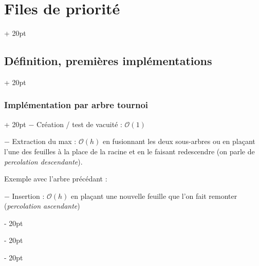 \documentclass[a4paper, 12pt, twoside]{article}
\newcommand{\ind}[1][20pt]{\advance\leftskip + #1}
\newcommand{\deind}[1][20pt]{\advance\leftskip - #1}
\newenvironment{indt}[2][20pt]{#2 \par \ind[#1]}{\par \deind} %
\begin{document}
\begin{indt}{\section{Files de priorité}}
\begin{indt}{\subsection{Définition, premières implémentations}}
\begin{indt}{\subsubsection{Implémentation par arbre tournoi}}
                $-$ Création / test de vacuité : $\mathcal O(1)$
                
                $-$ Extraction du max : $\mathcal O(h)$ en fusionnant les deux sous-arbres ou en plaçant l'une des feuilles à la place de la racine et en le faisant redescendre (on parle de \textit{percolation descendante}).
                
                Exemple avec l'arbre précédant :
                \begin{center}
                \end{center}
                
                $-$ Insertion : $\mathcal O(h)$ en plaçant une nouvelle feuille que l'on fait remonter (\textit{percolation ascendante})
                

\end{indt}
\end{indt}
\end{indt}
\end{document}
